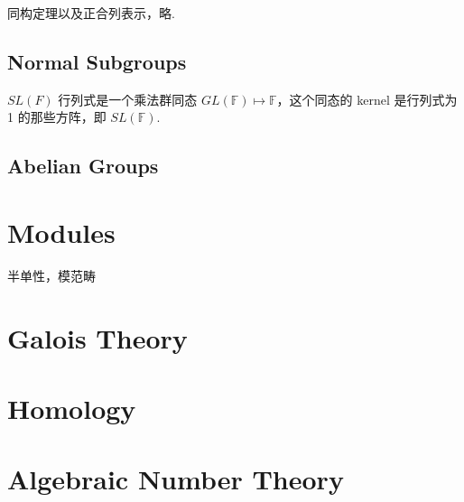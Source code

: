 \documentclass[a4paper, 12pt]{article}
\newcommand{\F}{\mathbb{F}}
\begin{document}
同构定理以及正合列表示，略.

\subsection{Normal Subgroups}

\begin{Example}{$SL(F)$}{}
行列式是一个乘法群同态 $GL(\F) \mapsto \F$，这个同态的 kernel 是行列式为 1 的那些方阵，即 $SL(\F)$.
\end{Example}

\subsection{Abelian Groups}


\section{Modules}

半单性，模范畴

\section{Galois Theory}

\section{Homology}

\section{Algebraic Number Theory}

\printbibliography
\end{document}

